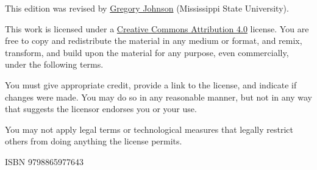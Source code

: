 \noindent This edition was revised by \href{http://loighic.net/}{Gregory Johnson} (Mississippi State University). %


\bigskip
\bigskip

\noindent \footnotesize This work is licensed under a \href{https://creativecommons.org/licenses/by/4.0/}{Creative Commons Attribution 4.0} license. 
You are free to copy and redistribute the material in any medium or format, and  remix, transform, and build upon the material for any purpose, even commercially, under the following terms.
\smallskip

\noindent You must give appropriate credit, provide a link to the license, and indicate if changes were made. You may do so in any reasonable manner, but not in any way that suggests the licensor endorses you or your use.
\smallskip

\noindent You may not apply legal terms or technological measures that legally restrict others from doing anything the license permits.

\normalsize 

\bigskip

\noindent ISBN 9798865977643  %
\medskip

\newcommand\Lua{%
\textcolor{magenta}{
  \hbox{L}\kern-.24em%
   \logosmaller{U}\kern-.28em%
  \lower0.5ex\hbox{A}\kern-.12em%
  }}
  
  


